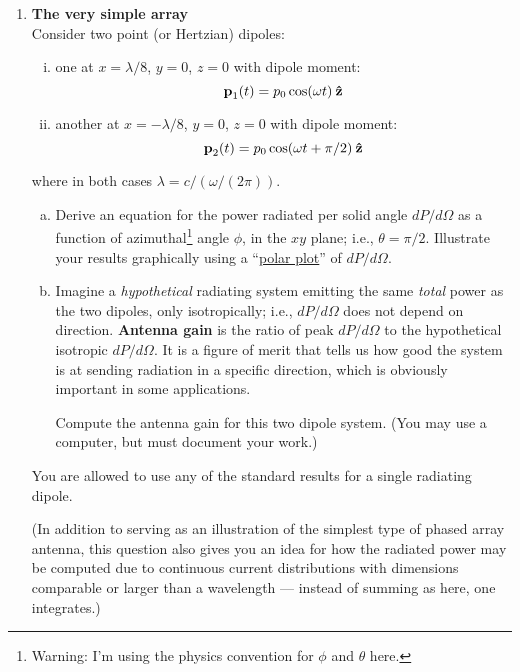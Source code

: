 \documentclass[12pt,geometry,width=8in]{article}
\begin{document}
\begin{enumerate}[(1),topsep=0pt,itemsep=0ex,partopsep=1ex,parsep=1ex]
\item \textbf{The very simple array}\\
Consider two point (or Hertzian) dipoles:
\begin{enumerate}[(i)]
\item one at $x=\lambda/8$, $y=0$, $z=0$ with dipole moment:
\begin{equation}
\boldsymbol{\mathbf{p}}_1(t) = p_0 \cos (\omega t) \: \boldsymbol{\mathbf{\hat{z}}}
\end{equation}
\item another at $x=-\lambda/8$, $y=0$, $z=0$ with dipole moment:
\begin{equation}
\boldsymbol{\mathbf{p}}_2(t) = p_0 \cos (\omega t + \pi/2) \: \boldsymbol{\mathbf{\hat{z}}}
\end{equation}
\end{enumerate}
where in both cases $\lambda = c/(\omega / (2\pi))$.

\begin{enumerate}[(a)]
\item Derive an equation for the power radiated per solid angle $dP/d\Omega$ as a function of azimuthal\footnote{Warning: I'm using the physics convention for $\phi$ and $\theta$ here.} angle $\phi$, in the $xy$ plane;  i.e., $\theta =\pi/2$.  Illustrate your results graphically using a  ``\href{https://matplotlib.org/3.1.0/gallery/pie_and_polar_charts/polar_demo.html}{polar plot}'' of $dP/d\Omega$.
\item Imagine a {\em hypothetical} radiating system emitting the same {\em total} power as the two dipoles, only isotropically; i.e., $dP/d\Omega$ does not depend on direction.  \textbf{Antenna gain} is the ratio of peak $dP/d\Omega$ to the hypothetical isotropic $dP/d\Omega$.  It is a figure of merit that tells us how good the system is at sending radiation in a specific direction, which is obviously important in some applications.

Compute the antenna gain for this two dipole system.  (You may use a computer, but must document your work.)
\end{enumerate}

You are allowed to use any of the standard results for a single radiating dipole.

(In addition to serving as an illustration of the simplest type of phased array antenna, this question also gives you an idea for how the radiated power may be computed due to continuous current distributions with dimensions comparable or larger than a wavelength --- instead of summing as here, one integrates.)


\end{enumerate}
\end{document}
